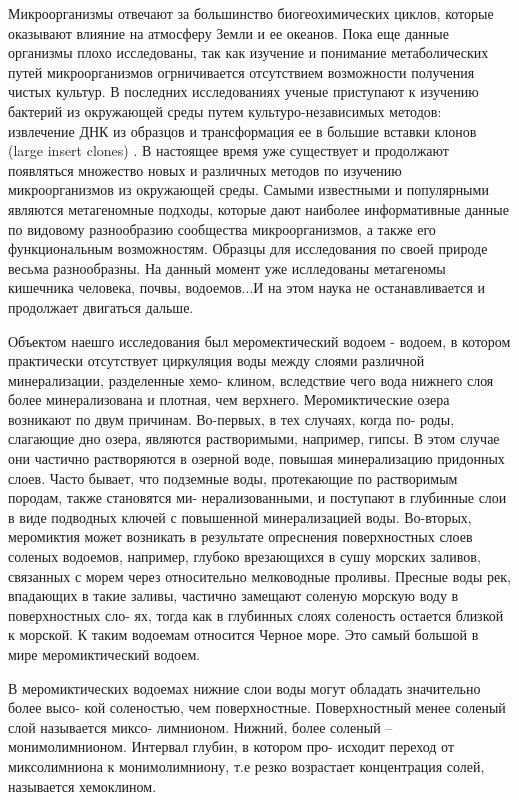 Микроорганизмы отвечают за большинство биогеохимических циклов, которые оказывают влияние на атмосферу Земли и ее океанов. Пока еще данные организмы плохо исследованы, так как изучение и понимание метаболических путей микроорганизмов огрничивается отсутствием возможности получения чистых культур. В последних исследованиях ученые приступают к изучению бактерий из окружающей среды путем культуро-независимых методов: извлечение ДНК из образцов и трансформация ее в большие вставки клонов (large insert clones) . В настоящее время уже существует и продолжают появляться множество новых и различных методов по изучению микроорганизмов из окружающей среды. Самыми известными и популярными являются метагеномные подходы, которые дают наиболее информативные данные по видовому разнообразию сообщества микроорганизмов, а также его функциональным возможностям. Образцы для исследования по своей природе весьма разнообразны. На данный момент уже ислледованы метагеномы кишечника человека, почвы, водоемов...И на этом наука не останавливается и продолжает двигаться дальше.

Объектом наешго исследования был меромектический водоем - водоем, в котором практически
отсутствует циркуляция воды между слоями различной минерализации, разделенные хемо-
клином, вследствие чего вода нижнего слоя более минерализована и плотная, чем верхнего.
Меромиктические озера возникают по двум причинам. Во-первых, в тех случаях, когда по-
роды, слагающие дно озера, являются растворимыми, например, гипсы. В этом случае они
частично растворяются в озерной воде, повышая минерализацию придонных слоев. Часто
бывает, что подземные воды, протекающие по растворимым породам, также становятся ми-
нерализованными, и поступают в глубинные слои в виде подводных ключей с повышенной
минерализацией воды. Во-вторых, меромиктия может возникать в результате опреснения
поверхностных слоев соленых водоемов, например, глубоко врезающихся в сушу морских
заливов, связанных с морем через относительно мелководные проливы. Пресные воды рек,
впадающих в такие заливы, частично замещают соленую морскую воду в поверхностных сло-
ях, тогда как в глубинных слоях соленость остается близкой к морской. К таким водоемам
относится Черное море. Это самый большой в мире меромиктический водоем.

В меромиктических водоемах нижние слои воды могут обладать значительно более высо-
кой соленостью, чем поверхностные. Поверхностный менее соленый слой называется миксо-
лимнионом. Нижний, более соленый – монимолимнионом. Интервал глубин, в котором про-
исходит переход от миксолимниона к монимолимниону, т.е резко возрастает концентрация
солей, называется хемоклином.

